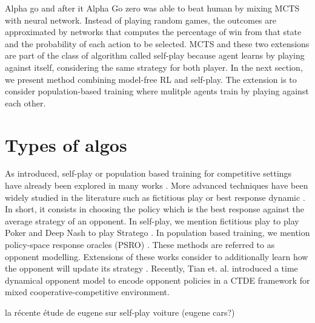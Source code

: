 Alpha go \citep{silver2016mastering} and after it Alpha Go zero \citep{silver2017mastering} was able to beat human by mixing MCTS with neural network.
Instead of playing random games, the outcomes are approximated by networks that computes the percentage of win from that state and the probability of each action to be selected.
MCTS and these two extensions are part of the class of algorithm called self-play because agent learns by playing against itself, considering the same strategy for both player.
In the next section, we present method combining model-free RL and self-play.
The extension is to consider population-based training where mulitple agents train by playing against each other.

\section{Types of algos}\label{sec:ch6_algo}

As introduced, self-play or population based training for competitive settings have already been explored in many works \citep{jaderberg2019human, vinyals2019grandmaster, baker2019emergent}.
More advanced techniques have been widely studied in the literature such as fictitious play \cite{brown1951iterative} or best response dynamic \citep{baudin2022fictitious}.
In short, it consists in choosing the policy which is the best response against the average strategy of an opponent.
In self-play, we mention fictitious play to play Poker \citep{pmlr-v37-heinrich15} and Deep Nash to play Stratego \citep{DM_stratego}.
In population based training, we mention policy-space response oracles (PSRO) \citep{NIPS2017_3323fe11, Muller2020A}.
These methods are referred to as opponent modelling.
Extensions of these works consider to additionally learn how the opponent will update its strategy \citep{he2016opponent, foerster2017learning}.
Recently, Tian et. al. \citep{tian2022multi} introduced a time dynamical opponent model to encode opponent policies in a CTDE framework for mixed cooperative-competitive environment.

la récente étude de eugene sur self-play voiture (eugene cars?)
